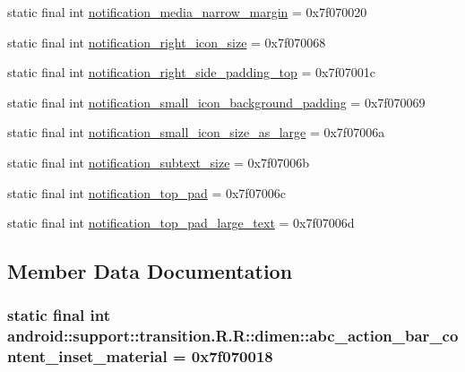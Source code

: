 \begin{CompactItemize}
\item 
static final int \hyperlink{classandroid_1_1support_1_1transition_1_1_r_1_1dimen_738cfd89c8ee6ad840a0003ebe144e1b}{notification\_\-media\_\-narrow\_\-margin} = 0x7f070020
\item 
static final int \hyperlink{classandroid_1_1support_1_1transition_1_1_r_1_1dimen_450598b424935713f7781ddc0159af76}{notification\_\-right\_\-icon\_\-size} = 0x7f070068
\item 
static final int \hyperlink{classandroid_1_1support_1_1transition_1_1_r_1_1dimen_a0a40c6a91994c9eca1fc6acc103fb31}{notification\_\-right\_\-side\_\-padding\_\-top} = 0x7f07001c
\item 
static final int \hyperlink{classandroid_1_1support_1_1transition_1_1_r_1_1dimen_50a560d1e6c798e7b43101d4a44a13dd}{notification\_\-small\_\-icon\_\-background\_\-padding} = 0x7f070069
\item 
static final int \hyperlink{classandroid_1_1support_1_1transition_1_1_r_1_1dimen_b8ebca59d128ed03b0c13e3e2e1578bd}{notification\_\-small\_\-icon\_\-size\_\-as\_\-large} = 0x7f07006a
\item 
static final int \hyperlink{classandroid_1_1support_1_1transition_1_1_r_1_1dimen_d60a8cdcab3668bf358212e431fa33dc}{notification\_\-subtext\_\-size} = 0x7f07006b
\item 
static final int \hyperlink{classandroid_1_1support_1_1transition_1_1_r_1_1dimen_df992c0629a84e68b6831b779afed8d7}{notification\_\-top\_\-pad} = 0x7f07006c
\item 
static final int \hyperlink{classandroid_1_1support_1_1transition_1_1_r_1_1dimen_69f101c098572c716e317db352ce9833}{notification\_\-top\_\-pad\_\-large\_\-text} = 0x7f07006d
\end{CompactItemize}


\subsection{Member Data Documentation}
\hypertarget{classandroid_1_1support_1_1transition_1_1_r_1_1dimen_454a64f0132082e39b17afb2741caa8a}{
\subsubsection[{abc\_\-action\_\-bar\_\-content\_\-inset\_\-material}]{\setlength{\rightskip}{0pt plus 5cm}static final int android::support::transition.R.R::dimen::abc\_\-action\_\-bar\_\-content\_\-inset\_\-material = 0x7f070018}}
\label{classandroid_1_1support_1_1transition_1_1_r_1_1dimen_454a64f0132082e39b17afb2741caa8a}


